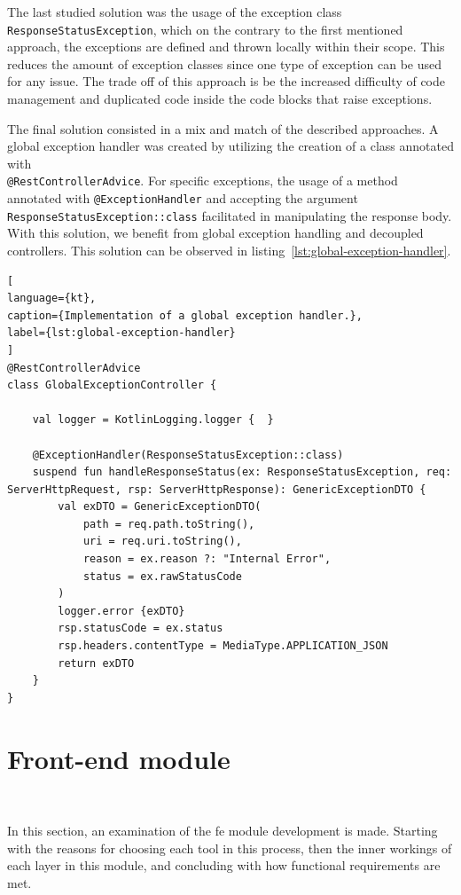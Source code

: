 The last studied solution was the usage of the exception class  \lstinline{ResponseStatusException}, which on the contrary to the first mentioned approach, the exceptions are defined and thrown locally within their scope. This reduces the amount of exception classes since one type of exception can be used for any issue. The trade off of this approach is be the increased difficulty of code management and duplicated code inside the code blocks that raise exceptions. 

The final solution consisted in a mix and match of the described approaches. 
A global exception handler was created by utilizing the creation of a class annotated with \\\lstinline{@RestControllerAdvice}. For specific exceptions, the usage of a method annotated with \lstinline{@ExceptionHandler} and accepting the argument \lstinline{ResponseStatusException::class} facilitated in manipulating the response body. With this solution, we benefit from global exception handling and decoupled controllers. This solution can be observed in listing~\ref{lst:global-exception-handler}.

\begin{lstlisting}[
language={kt},
caption={Implementation of a global exception handler.},
label={lst:global-exception-handler}
]
@RestControllerAdvice
class GlobalExceptionController {

    val logger = KotlinLogging.logger {  }

    @ExceptionHandler(ResponseStatusException::class)
    suspend fun handleResponseStatus(ex: ResponseStatusException, req: ServerHttpRequest, rsp: ServerHttpResponse): GenericExceptionDTO {
        val exDTO = GenericExceptionDTO(
            path = req.path.toString(),
            uri = req.uri.toString(),
            reason = ex.reason ?: "Internal Error",
            status = ex.rawStatusCode
        )
        logger.error {exDTO}
        rsp.statusCode = ex.status
        rsp.headers.contentType = MediaType.APPLICATION_JSON
        return exDTO
    }
}
\end{lstlisting}



\section{Front-end module}~\label{ch:impl:sec:fe}

In this section, an examination of the \acrlong{fe} module development is made. Starting with the reasons for choosing each tool in this process, then the inner workings of each layer in this module, and concluding with how functional requirements are met.


